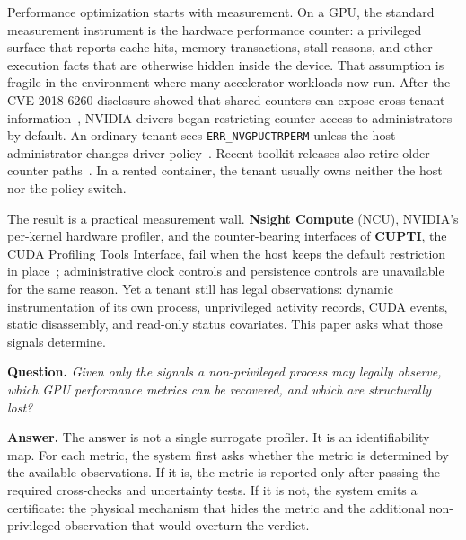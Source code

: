 \documentclass[conference]{IEEEtran}
\begin{document}
Performance optimization starts with measurement. On a GPU, the standard
measurement instrument is the hardware performance counter: a privileged
surface that reports cache hits, memory transactions, stall reasons, and other
execution facts that are otherwise hidden inside the device. That assumption is
fragile in the environment where many accelerator workloads now run. After the
CVE-2018-6260 disclosure showed that shared counters can expose cross-tenant
information~\cite{naghibijouybari2018rendered,cve_2018_6260}, NVIDIA drivers
began restricting counter access to administrators by default. An ordinary
tenant sees \texttt{ERR\_NVGPUCTRPERM} unless the host administrator changes
driver policy~\cite{nvidia_errnvgpuctrperm}. Recent toolkit releases also
retire older counter paths~\cite{nvidia_cupti}. In a rented container, the
tenant usually owns neither the host nor the policy switch.

The result is a practical measurement wall. \textbf{Nsight Compute} (NCU),
NVIDIA's per-kernel hardware profiler, and the counter-bearing interfaces of
\textbf{CUPTI}, the CUDA Profiling Tools Interface, fail when the host keeps the default
restriction in place~\cite{nvidia_nsightcompute,nvidia_cupti}; administrative
clock controls and persistence controls are unavailable for the same reason.
Yet a tenant still has legal observations: dynamic instrumentation of its own
process, unprivileged activity records, CUDA events, static disassembly, and
read-only status covariates. This paper asks what those signals determine.

\smallskip
\noindent\textbf{Question.} \emph{Given only the signals a non-privileged
process may legally observe, which GPU performance metrics can be recovered,
and which are structurally lost?}

\smallskip
\noindent\textbf{Answer.} The answer is not a single surrogate profiler. It is
an identifiability map. For each metric, the system first asks whether the
metric is determined by the available observations. If it is, the metric is
reported only after passing the required cross-checks and uncertainty tests. If
it is not, the system emits a certificate: the physical mechanism that hides the
metric and the additional non-privileged observation that would overturn the
verdict.
\end{document}
